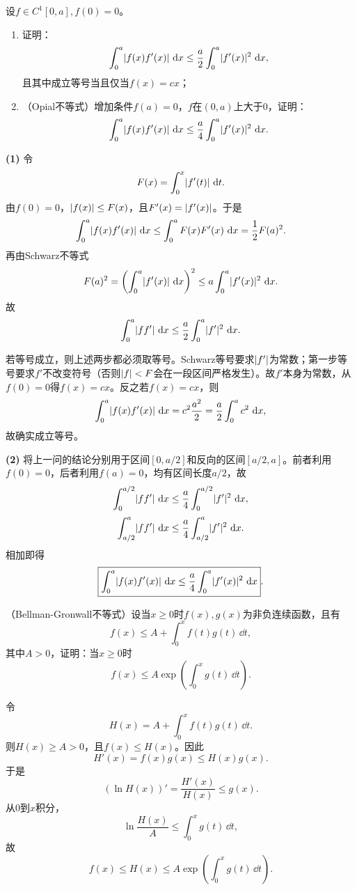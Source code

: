 \begin{xreferenceproblem}[8]
设$f\in C^1[0,a],f(0)=0$。
  \begin{enumerate}[label=(\arabic*)]
    \item 证明：
    \[
      \int_0^a\lvert f(x)f'(x)\rvert\,\mathop{}\!\mathrm{d} x
      \le\frac a2\int_0^a\lvert f'(x)\rvert^2\,\mathop{}\!\mathrm{d} x,
    \]
    且其中成立等号当且仅当$f(x)=cx$；
    \item （Opial不等式）增加条件$f(a)=0$，$f$在$(0,a)$上大于0，证明：
    \[
      \int_0^a\lvert f(x)f'(x)\rvert\,\mathop{}\!\mathrm{d} x
      \le\frac a4\int_0^a\lvert f'(x)\rvert^2\,\mathop{}\!\mathrm{d} x.
    \]
  \end{enumerate}
\end{xreferenceproblem}
\begin{xsolution}
\textbf{(1)}\quad
令
\[
 F(x)=\int_0^x\lvert f'(t)\rvert\,\mathop{}\!\mathrm{d} t.
\]
由$f(0)=0$，$\lvert f(x)\rvert\le F(x)$，且$F'(x)=\lvert f'(x)\rvert$。于是
\[
 \int_0^a\lvert f(x)f'(x)\rvert\,\mathop{}\!\mathrm{d} x
 \le\int_0^aF(x)F'(x)\,\mathop{}\!\mathrm{d} x
 =\frac12F(a)^2.
\]
再由Schwarz不等式
\[
 F(a)^2=\left(\int_0^a\lvert f'(x)\rvert\,\mathop{}\!\mathrm{d} x\right)^2
 \le a\int_0^a\lvert f'(x)\rvert^2\,\mathop{}\!\mathrm{d} x.
\]
故
\[
 \int_0^a\lvert ff'\rvert\,\mathop{}\!\mathrm{d} x
 \le\frac a2\int_0^a\lvert f'\rvert^2\,\mathop{}\!\mathrm{d} x.
\]

若等号成立，则上述两步都必须取等号。Schwarz等号要求$\lvert f'\rvert$为常数；第一步等号要求$f'$不改变符号（否则$\lvert f\rvert<F$会在一段区间严格发生）。故$f'$本身为常数，从$f(0)=0$得$f(x)=cx$。反之若$f(x)=cx$，则
\[
 \int_0^a\lvert f(x)f'(x)\rvert\,\mathop{}\!\mathrm{d} x
 =c^2\frac{a^2}{2}
 =\frac a2\int_0^ac^2\,\mathop{}\!\mathrm{d} x,
\]
故确实成立等号。

\textbf{(2)}\quad
将上一问的结论分别用于区间$[0,a/2]$和反向的区间$[a/2,a]$。前者利用$f(0)=0$，后者利用$f(a)=0$，均有区间长度$a/2$，故
\[
 \int_0^{a/2}\lvert ff'\rvert\,\mathop{}\!\mathrm{d} x
 \le\frac a4\int_0^{a/2}\lvert f'\rvert^2\,\mathop{}\!\mathrm{d} x,
\]
\[
 \int_{a/2}^{a}\lvert ff'\rvert\,\mathop{}\!\mathrm{d} x
 \le\frac a4\int_{a/2}^{a}\lvert f'\rvert^2\,\mathop{}\!\mathrm{d} x.
\]
相加即得
\[
 \boxed{\int_0^a\lvert f(x)f'(x)\rvert\,\mathop{}\!\mathrm{d} x
 \le\frac a4\int_0^a\lvert f'(x)\rvert^2\,\mathop{}\!\mathrm{d} x}.
\]
\end{xsolution}


\begin{xreferenceproblem}[9]
（Bellman-Gronwall不等式）设当$x\ge0$时$f(x),g(x)$为非负连续函数，且有
  \[
    f(x)\le A+\int_0^xf(t)g(t)\,\dd t,
  \]
  其中$A>0$，证明：当$x\ge0$时
  \[
    f(x)\le A\exp\left(\int_0^xg(t)\,\dd t\right).
  \]
\end{xreferenceproblem}
\begin{xsolution}
令
\[
 H(x)=A+\int_0^xf(t)g(t)\,\dd t.
\]
则$H(x)\ge A>0$，且$f(x)\le H(x)$。因此
\[
 H'(x)=f(x)g(x)\le H(x)g(x).
\]
于是
\[
 (\ln H(x))'=\frac{H'(x)}{H(x)}\le g(x).
\]
从0到$x$积分，
\[
 \ln\frac{H(x)}A\le\int_0^xg(t)\,\dd t,
\]
故
\[
 f(x)\le H(x)\le A\exp\left(\int_0^xg(t)\,\dd t\right).
\]
\end{xsolution}


